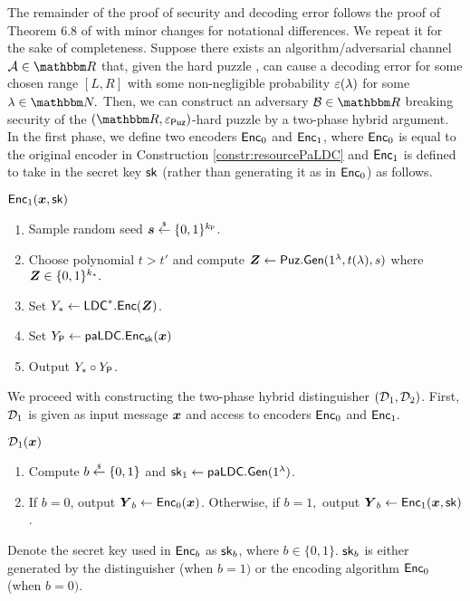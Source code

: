 \begin{IEEEproof}
    The remainder of the proof of security and decoding error follows the proof of Theorem $6.8$ of \cite{SCN:AmeBloBlo22} with minor changes for notational differences.
    We repeat it for the sake of completeness.
    Suppose there exists an algorithm/adversarial channel $\calA \in \R$ that, given the hard puzzle \Puz, can cause a decoding error for some chosen range $[L,R]$ with some non-negligible probability $\varepsilon(\lambda)$ for some $\lambda \in \N.$
    Then, we can construct an adversary $\calB \in \R$ breaking security of the $(\R,\epsPuz)$-hard puzzle by a two-phase hybrid argument.
    In the first phase, we define two encoders $\mathsf{Enc}_0$ and $\mathsf{Enc}_1$, where $\mathsf{Enc}_0$ is equal to the original encoder in Construction \ref{constr:resourcePaLDC} and $\mathsf{Enc}_1$ is defined to take in the secret key $\mathsf{sk}$ (rather than generating it as in $\mathsf{Enc}_0$) as follows.
    \begin{weirdFrame}{$\mathsf{Enc}_1({\boldsymbol{x}},\mathsf{sk})$}
                \begin{enumerate}
            \item Sample random seed $\boldsymbol{s} \overset{{\scriptscriptstyle\$}}{\leftarrow} \{0,1\}^{k_{\mathsf{P}}}$.
            \item Choose polynomial $t > t'$ and compute $\boldsymbol{Z} \leftarrow \mathsf{Puz}.\mathsf{Gen}(1^\lambda,t(\lambda),s)$ where $\boldsymbol{Z} \in \{0,1\}^{k_{\mathsf{*}}}.$
            \item Set $Y_{*} \leftarrow \mathsf{LDC}^*.\mathsf{Enc}(\boldsymbol{Z})$.
            \item Set $Y_{\mathsf{P}} \leftarrow \mathsf{paLDC}.\mathsf{Enc}_{\mathsf{sk}}({\boldsymbol{x}})$
            \item Output $Y_{*} \circ Y_{\mathsf{P}}$.
        \end{enumerate}
    \end{weirdFrame}
    We proceed with constructing the two-phase hybrid distinguisher $(\mathcal{D}_1,\mathcal{D}_2)$.
    First, $\mathcal{D}_1$ is given as input message ${\boldsymbol{x}}$ and access to encoders $\mathsf{Enc}_0$ and $\mathsf{Enc}_1.$
    \begin{weirdFrame}{$\mathcal{D}_1({\boldsymbol{x}})$}
        \begin{enumerate}
            \item Compute $b \overset{{\scriptscriptstyle\$}}{\leftarrow} \{0,1\}$ and $\mathsf{sk}_1 \leftarrow \mathsf{paLDC}.\mathsf{Gen}(1^\lambda)$.
            \item If $b = 0$, output $\boldsymbol{Y}_b \leftarrow \mathsf{Enc}_0({\boldsymbol{x}})$. 
            Otherwise, if $b = 1,$ output $\boldsymbol{Y}_b \leftarrow \mathsf{Enc}_1({\boldsymbol{x}},\mathsf{sk})$.
        \end{enumerate}
    \end{weirdFrame}
    Denote the secret key used in $\mathsf{Enc}_b$ as $\mathsf{sk}_b$, where $b \in \{0,1\}$. 
    $\mathsf{sk}_b$ is either generated by the distinguisher (when $b = 1)$ or the encoding algorithm $\mathsf{Enc}_0$ (when $b = 0)$.

\end{IEEEproof}
